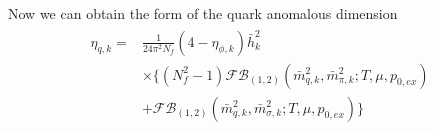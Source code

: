 \documentclass[%
reprint,
superscriptaddress,
showpacs,preprintnumbers,
 amsmath,amssymb,
 aps,
prd,
]{revtex4-1}
\begin{document}
Now we can obtain the form of the quark anomalous dimension
\begin{align}
\begin{split}
\eta_{q,k}=&\frac{1}{24\pi^2N_f}(4-\eta_{\phi,k})\bar{h}^{2}_{k}\\
&\times\{ (N^{2}_{f}-1)\mathcal{FB}_{(1,2)}(\bar{m}^{2}_{q,k},\bar{m}^{2}_{\pi,k};T,\mu,p_{0,ex})\\
&+\mathcal{FB}_{(1,2)}(\bar{m}^{2}_{q,k},\bar{m}^{2}_{\sigma,k};T,\mu,p_{0,ex}) \}
\end{split}
\end{align} 


\end{document}
